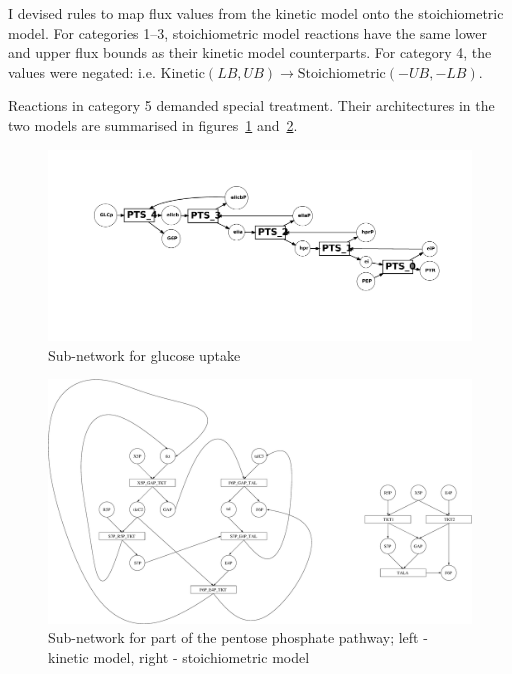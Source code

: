 \documentclass[a4paper, 12pt]{scrartcl}
\begin{document}
{I devised rules to map flux values from the kinetic model onto the stoichiometric model. For categories 1--3, stoichiometric model reactions have the same lower and upper flux bounds as their kinetic model counterparts. For category 4, the values were negated: i.e. $ \mathrm{Kinetic } (LB, UB) \rightarrow \mathrm{Stoichiometric } (-UB, -LB)$. %

Reactions in category 5 demanded special treatment. Their architectures in the two models are summarised in figures~\ref{fig:glucoseuptake} and~\ref{fig:ppp}.

\begin{figure}[!p]
  \centering
  \includegraphics[scale=0.4]{glucoseuptake}
  \caption{Sub-network for glucose uptake}
  \label{fig:glucoseuptake}
\end{figure}

\begin{figure}[!p]
  \centering
  \includegraphics[scale=0.25]{ppp}
  \caption{Sub-network for part of the pentose phosphate pathway; left - kinetic model, right - stoichiometric model}
  \label{fig:ppp}
\end{figure}

}
\end{document}
